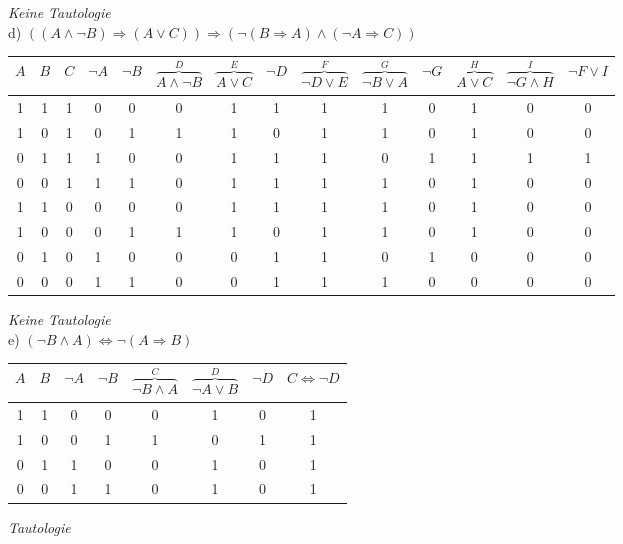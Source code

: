 \textit{Keine Tautologie}\\

d) $((A \land \lnot B) \Rightarrow (A \lor C)) \Rightarrow (\lnot (B \Rightarrow A) \land (\lnot A \Rightarrow C))$\\

\begin{table}[h]
\scriptsize
\centering
\begin{tabular}{c|c|c|c|c|c|c|c|c|c|c|c|c|c}
$A$ & $B$ & $C$ & $\lnot A$ & $\lnot B$ & $\overbrace{A \land \lnot B}^{D}$ & $\overbrace{A \lor C}^{E}$ & $\lnot D$ & $\overbrace{\lnot D \lor E}^{F}$ & $\overbrace{\lnot B \lor A}^{G}$ & $\lnot G$ & $\overbrace{A \lor C}^{H}$ & $\overbrace{\lnot G \land H}^{I}$ & $\lnot F \lor I$\\
\hline
1 & 1 & 1 & 0 & 0 & 0 & 1 & 1 & 1 & 1 & 0 & 1 & 0 & 0\\
1 & 0 & 1 & 0 & 1 & 1 & 1 & 0 & 1 & 1 & 0 & 1 & 0 & 0\\
0 & 1 & 1 & 1 & 0 & 0 & 1 & 1 & 1 & 0 & 1 & 1 & 1 & 1\\
0 & 0 & 1 & 1 & 1 & 0 & 1 & 1 & 1 & 1 & 0 & 1 & 0 & 0\\
1 & 1 & 0 & 0 & 0 & 0 & 1 & 1 & 1 & 1 & 0 & 1 & 0 & 0\\
1 & 0 & 0 & 0 & 1 & 1 & 1 & 0 & 1 & 1 & 0 & 1 & 0 & 0\\
0 & 1 & 0 & 1 & 0 & 0 & 0 & 1 & 1 & 0 & 1 & 0 & 0 & 0\\
0 & 0 & 0 & 1 & 1 & 0 & 0 & 1 & 1 & 1 & 0 & 0 & 0 & 0\\
\end{tabular}
\end{table}

\textit{Keine Tautologie}\\

e) $(\lnot B \land A) \Leftrightarrow \lnot (A \Rightarrow B)$\\

\begin{table}[h]
\centering
\begin{tabular}{c|c|c|c|c|c|c|c}
$A$ & $B$ & $\lnot A$ & $\lnot B$ & $\overbrace{\lnot B \land A}^{C}$ & $\overbrace{\lnot A \lor B}^{D}$ & $\lnot D$ & $C \Leftrightarrow \lnot D$\\
\hline
1 & 1 & 0 & 0 & 0 & 1 & 0 & 1\\
1 & 0 & 0 & 1 & 1 & 0 & 1 & 1\\
0 & 1 & 1 & 0 & 0 & 1 & 0 & 1\\
0 & 0 & 1 & 1 & 0 & 1 & 0 & 1\\
\end{tabular}
\end{table}

\textit{Tautologie}